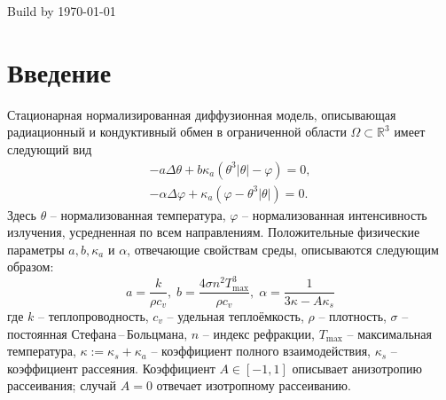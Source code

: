 \documentclass[10pt]{article}
\begin{document}
    Build by \today
    \section{Введение}\label{sec:intro}
    Стационарная нормализированная диффузионная модель, описывающая радиационный и кондуктивный
    обмен в ограниченной области $\Omega \subset \mathbb{R}^3$ имеет следующий вид~\cite{modest-rht}
    \begin{equation}
        \label{initial}
        \begin{aligned}
            - a \Delta \theta + b \kappa_a(\theta ^ 3 | \theta | - \varphi) = 0,  \\
            - \alpha \Delta \varphi + \kappa_a (\varphi - \theta ^3 | \theta |) = 0.
        \end{aligned}
    \end{equation}
    Здесь $\theta$ – нормализованная температура,
    $\varphi$ – нормализованная интенсивность излучения, усредненная по всем направлениям.
    Положительные физические параметры $a, b, \kappa_a $ и $\alpha$,
    отвечающие свойствам среды, описываются следующим образом:
    \[
        a = \frac{k}{\rho c_v}, \; b = \frac{4 \sigma n^2 T^3_{\text{max}}}{\rho c_v}, \;
        \alpha = \frac{1}{3\kappa -A \kappa_s}
    \]
    где $k$ -- теплопроводность, $c_v$ -- удельная теплоёмкость, $\rho$ -- плотность,
    $\sigma$ -- постоянная Стефана\,--\,Больцмана, $n$ -- индекс рефракции,
    $T_{\text{max}}$ -- максимальная температура, $\kappa := \kappa_s + \kappa_a$ -- коэффициент
    полного взаимодействия, $\kappa_s$ -- коэффициент рассеяния.
    Коэффициент $A \in [-1,1]$ описывает анизотропию рассеивания;
    случай $A=0$ отвечает изотропному рассеиванию.
\end{document}
